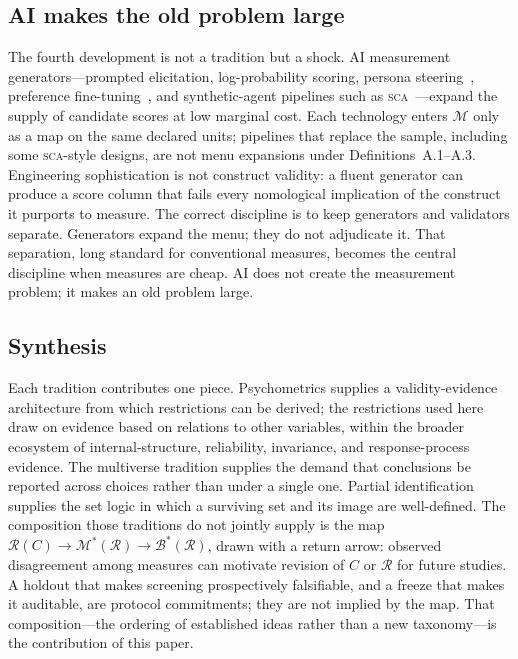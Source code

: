 \documentclass[10pt,letterpaper]{article}
\newcommand{\SCA}{\textsc{sca}}
\newcommand{\LLM}{\textsc{llm}}
\newcommand{\cvp}{\texttt{cvprofiles}}
\newcommand{\M}{\ensuremath{\mathcal{M}}}
\newcommand{\E}{\mathbb{E}}
\newcommand{\Rset}{\mathcal{R}}
\newcommand{\Bset}{\mathcal{B}}
\begin{document}
\subsection{AI makes the old problem large}
The fourth development is not a tradition but a shock.
AI measurement generators---prompted elicitation, log-probability scoring, persona steering~\cite{disca2026}, preference fine-tuning~\cite{rafailov2023,plural2026,palms2026}, and synthetic-agent pipelines such as \SCA{}~\cite{capra2025}---expand the supply of candidate scores at low marginal cost.
Each technology enters $\M$ only as a map on the same declared units; pipelines that replace the sample, including some \SCA{}-style designs, are not menu expansions under Definitions~A.1--A.3.
Engineering sophistication is not construct validity: a fluent generator can produce a score column that fails every nomological implication of the construct it purports to measure.
The correct discipline is to keep generators and validators separate.
Generators expand the menu; they do not adjudicate it.
That separation, long standard for conventional measures, becomes the central discipline when measures are cheap.
AI does not create the measurement problem; it makes an old problem large.

\subsection{Synthesis}
Each tradition contributes one piece.
Psychometrics supplies a validity-evidence architecture from which restrictions can be derived; the restrictions used here draw on evidence based on relations to other variables, within the broader ecosystem of internal-structure, reliability, invariance, and response-process evidence.
The multiverse tradition supplies the demand that conclusions be reported across choices rather than under a single one.
Partial identification supplies the set logic in which a surviving set and its image are well-defined.
The composition those traditions do not jointly supply is the map $\Rset(C)\to\M^*(\Rset)\to\Bset^*(\Rset)$, drawn with a return arrow: observed disagreement among measures can motivate revision of $C$ or $\Rset$ for future studies.
A holdout that makes screening prospectively falsifiable, and a freeze that makes it auditable, are protocol commitments; they are not implied by the map.
That composition---the ordering of established ideas rather than a new taxonomy---is the contribution of this paper.

\end{document}
